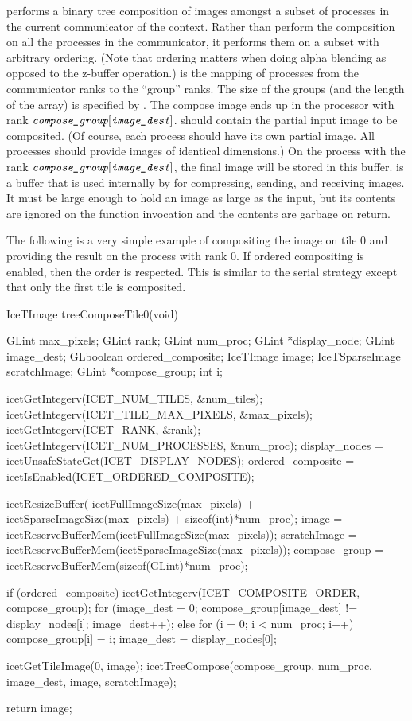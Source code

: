  performs a binary tree composition of images
amongst a subset of processes in the current communicator of the context.
Rather than perform the composition on all the processes in the
communicator, it performs them on a subset with arbitrary ordering. (Note
that ordering matters when doing alpha blending as opposed to the z-buffer
operation.)   is the mapping of processes from the
communicator ranks to the ``group'' ranks.  The size of the groups (and the
length of the  array) is specified by
.  The compose image ends up in the processor with rank
$\emph{\texttt{compose\_group}}[\emph{\texttt{image\_dest}}]$.   should
contain the partial input image to be composited. (Of course, each process
should have its own partial image.  All processes should provide images of
identical dimensions.)  On the process with the rank
$\emph{\texttt{compose\_group}}[\emph{\texttt{image\_dest}}]$, the final image will be stored
in this buffer.   is a buffer that is used
internally by  for compressing, sending, and
receiving images.  It must be large enough to hold an image as large as the
input, but its contents are ignored on the function invocation and the
contents are garbage on return.

The following is a very simple example of compositing the image on tile 0
and providing the result on the process with rank 0.  If ordered
compositing is enabled, then the order is respected.  This is similar to
the serial strategy except that only the first tile
is composited.

\begin{code}
IceTImage treeComposeTile0(void)
{
  GLint max_pixels;
  GLint rank;
  GLint num_proc;
  GLint *display_node;
  GLint image_dest;
  GLboolean ordered_composite;
  IceTImage image;
  IceTSparseImage scratchImage;
  GLint *compose_group;
  int i;

  icetGetIntegerv(ICET_NUM_TILES, &num_tiles);
  icetGetIntegerv(ICET_TILE_MAX_PIXELS, &max_pixels);
  icetGetIntegerv(ICET_RANK, &rank);
  icetGetIntegerv(ICET_NUM_PROCESSES, &num_proc);
  display_nodes = icetUnsafeStateGet(ICET_DISPLAY_NODES);
  ordered_composite = icetIsEnabled(ICET_ORDERED_COMPOSITE);

  icetResizeBuffer(  icetFullImageSize(max_pixels)
                   + icetSparseImageSize(max_pixels)
                   + sizeof(int)*num_proc);
  image         = icetReserveBufferMem(icetFullImageSize(max_pixels));
  scratchImage  = icetReserveBufferMem(icetSparseImageSize(max_pixels));
  compose_group = icetReserveBufferMem(sizeof(GLint)*num_proc);

  if (ordered_composite) {
    icetGetIntegerv(ICET_COMPOSITE_ORDER, compose_group);
    for (image_dest = 0; compose_group[image_dest] != display_nodes[i];
         image_dest++);
  } else {
    for (i = 0; i < num_proc; i++) {
      compose_group[i] = i;
    }
    image_dest = display_nodes[0];
  }

  icetGetTileImage(0, image);
  icetTreeCompose(compose_group, num_proc, image_dest, image, scratchImage);

  return image;
}
\end{code}

